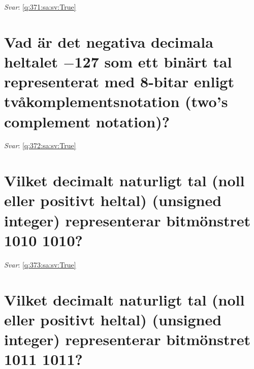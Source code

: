 \documentclass[a4paper,11pt,oneside]{book}
\begin{document}
\begin{sloppypar}
\label{q:371:sa:sv:False}

\vspace{2cm}

\noindent\makebox[\textwidth]{\hrulefill}

\vspace{1cm}

\textit{Svar}: \autoref{q:371:sa:sv:True}



\section{Vad \"ar det negativa decimala heltalet \ensuremath{-}127 som ett bin\"art tal representerat med 8-bitar enligt tv\r{a}komplementsnotation (two{\textquoteright}s complement notation)?}

\label{q:372:sa:sv:False}

\vspace{2cm}

\noindent\makebox[\textwidth]{\hrulefill}

\vspace{1cm}

\textit{Svar}: \autoref{q:372:sa:sv:True}



\section{Vilket decimalt naturligt tal (noll eller positivt heltal) (unsigned integer) representerar bitm\"onstret 1010 1010?}

\label{q:373:sa:sv:False}

\vspace{2cm}

\noindent\makebox[\textwidth]{\hrulefill}

\vspace{1cm}

\textit{Svar}: \autoref{q:373:sa:sv:True}



\section{Vilket decimalt naturligt tal (noll eller positivt heltal) (unsigned integer) representerar bitm\"onstret 1011 1011?}

\label{q:374:sa:sv:False}

\vspace{2cm}


\end{sloppypar}
\end{document}
